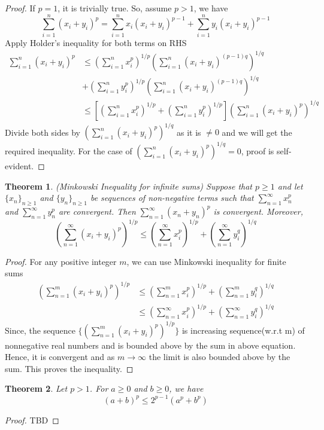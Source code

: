 \documentclass[12pt]{report}
\newtheorem{thm}{Theorem}
\begin{document}
\begin{proof}
    If $p = 1$, it is trivially true. So, assume $p > 1$, we have
    $$ \sum\limits_{i=1}^n(x_i + y_i)^p = \sum\limits_{i=1}^{n} x_i(x_i + y_i)^{p-1} + \sum\limits_{i = 1}^n y_i(x_i + y_i)^{p-1}$$
    Apply Holder's inequality for both terms on RHS
    \begin{align*}
        \sum\limits_{i=1}^n(x_i + y_i)^p &\leq \left(\sum\limits_{i=1}^n x_i^p \right)^{1/p} \left(\sum\limits_{i=1}^n (x_i + y_i)^{(p-1)q}\right)^{1/q} \\
        &+ \left(\sum\limits_{i=1}^n y_i^p \right)^{1/p} \left(\sum\limits_{i=1}^n (x_i + y_i)^{(p-1)q}\right)^{1/q}\\
        &\leq \left[\left(\sum\limits_{i=1}^n x_i^p\right)^{1/p} + \left(\sum\limits_{i=1}^n y_i^p\right)^{1/p}\right] \left(\sum\limits_{i=1}^n(x_i + y_i)^p\right)^{1/q}
    \end{align*}
    Divide both sides by $\left(\sum\limits_{i=1}^n(x_i + y_i)^p\right)^{1/q}$ as it is $\neq 0$ and we will get the required inequality. For the case of $\left(\sum\limits_{i=1}^n(x_i + y_i)^p\right)^{1/q} = 0$, proof is self-evident. 
\end{proof}
\begin{thm}
    (Minkowski Inequality for infinite sums) Suppose that $p \geq 1$ and let $\{x_n\}_{n \geq 1}$ and $\{y_n\}_{n \geq 1}$ be sequences of non-negative terms such that $\sum\limits_{n=1}^{\infty} x_n^p$ and $\sum\limits_{n=1}^{\infty} y_n^p$ are convergent. Then $\sum\limits_{n=1}^{\infty} (x_n + y_n)^p$ is convergent. Moreover,
    $$ \left(\sum\limits_{n =1}^{\infty}(x_i + y_i)^p\right)^{1/p} \leq \left(\sum\limits_{n =1}^{\infty}x_i^p\right)^{1/p} + \left(\sum\limits_{n =1}^{\infty}y_i^q\right)^{1/q} $$
\end{thm}
\begin{proof}
    For any positive integer $m$, we can use Minkowski inequality for finite sums 
    \begin{align*}
        \left(\sum\limits_{n =1}^m(x_i + y_i)^p\right)^{1/p} &\leq \left(\sum\limits_{n =1}^mx_i^p\right)^{1/p} + \left(\sum\limits_{n =1}^my_i^q\right)^{1/q}\\
        &\leq \left(\sum\limits_{n =1}^{\infty}x_i^p\right)^{1/p} + \left(\sum\limits_{n =1}^{\infty}y_i^q\right)^{1/q}
    \end{align*}
    Since, the sequence $\{(\sum\limits_{n =1}^m(x_i + y_i)^p)^{1/p}\}$ is increasing sequence(w.r.t m) of nonnegative real numbers and is bounded above by the sum in above equation. Hence, it is convergent and as $m \to \infty$ the limit is also bounded above by the sum. This proves the inequality.
\end{proof}
\begin{thm}
    Let $p > 1$. For $ a \geq 0$ and $ b \geq 0$, we have
    $$ (a + b)^p \leq 2^{p-1}(a^p + b^p)$$
\end{thm}
\begin{proof}
    TBD
\end{proof}
\end{document}
